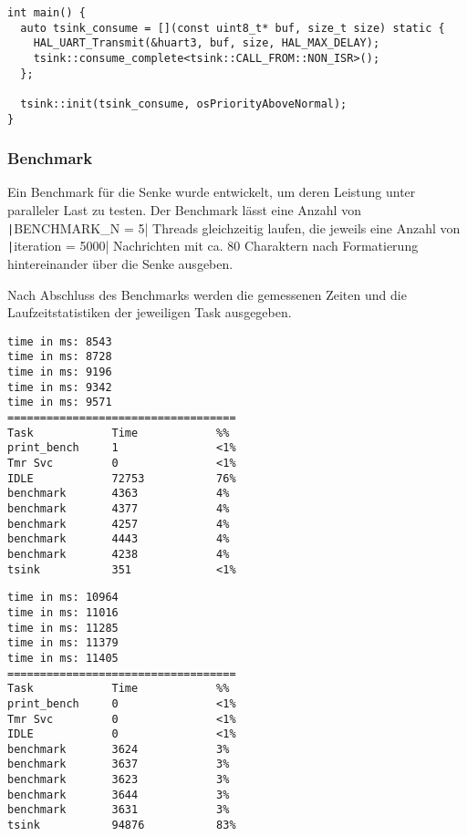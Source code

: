 \begin{code}
\begin{verbatim}
int main() {
  auto tsink_consume = [](const uint8_t* buf, size_t size) static {
    HAL_UART_Transmit(&huart3, buf, size, HAL_MAX_DELAY);
    tsink::consume_complete<tsink::CALL_FROM::NON_ISR>();
  };

  tsink::init(tsink_consume, osPriorityAboveNormal);
}
\end{verbatim}
\end{code}

\subsubsection{Benchmark}

Ein Benchmark für die Senke wurde entwickelt, um deren Leistung unter paralleler
Last zu testen. Der Benchmark lässt eine Anzahl von
\texttt|BENCHMARK_N = 5| Threads gleichzeitig laufen, die jeweils eine
Anzahl von \texttt|iteration = 5000| Nachrichten mit ca. 80 Charaktern
nach Formatierung hintereinander über die Senke ausgeben.

Nach Abschluss des Benchmarks werden die gemessenen Zeiten und die
Laufzeitstatistiken der jeweiligen Task ausgegeben.

\begin{minipage}[t]{0.5\textwidth}
    \begin{code}
        \begin{verbatim}
time in ms: 8543
time in ms: 8728
time in ms: 9196
time in ms: 9342
time in ms: 9571
===================================
Task            Time            %%
print_bench     1               <1%
Tmr Svc         0               <1%
IDLE            72753           76%
benchmark       4363            4%
benchmark       4377            4%
benchmark       4257            4%
benchmark       4443            4%
benchmark       4238            4%
tsink           351             <1%
    \end{verbatim}
    \end{code}
\end{minipage}
\hfill
\begin{minipage}[t]{0.5\textwidth}
    \begin{code}
        \begin{verbatim}
time in ms: 10964
time in ms: 11016
time in ms: 11285
time in ms: 11379
time in ms: 11405
===================================
Task            Time            %%
print_bench     0               <1%
Tmr Svc         0               <1%
IDLE            0               <1%
benchmark       3624            3%
benchmark       3637            3%
benchmark       3623            3%
benchmark       3644            3%
benchmark       3631            3%
tsink           94876           83%
    \end{verbatim}
    \end{code}
\end{minipage}

